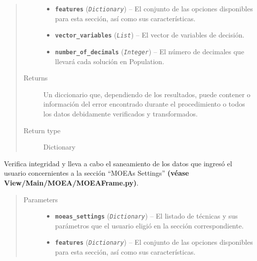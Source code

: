 \documentclass[letterpaper,10pt,english]{sphinxmanual}
\begin{document}
\begin{fulllineitems}
\begin{fulllineitems}
\begin{quote}
\begin{description}
\begin{itemize}
\item {} 
\textbf{\texttt{features}} (\emph{\texttt{Dictionary}}) -- El conjunto de las opciones disponibles 
para esta sección, así como sus características.

\item {} 
\textbf{\texttt{vector\_variables}} (\emph{\texttt{List}}) -- El vector de variables de decisión.

\item {} 
\textbf{\texttt{number\_of\_decimals}} (\emph{\texttt{Integer}}) -- El número de decimales que llevará cada solución en 
Population.

\end{itemize}

\item[{Returns}] \leavevmode
Un diccionario que, dependiendo de los resultados, puede contener
o información del error encontrado durante el procedimiento o 
todos los datos debidamente verificados y transformados.

\item[{Return type}] \leavevmode
Dictionary

\end{description}\end{quote}

\end{fulllineitems}


\begin{fulllineitems}
\label{Controller/Verifier:Controller.Verifier.Verifier.sanitize_moeas_settings}
Verifica integridad y lleva a cabo el saneamiento de 
los datos que ingresó el usuario concernientes a la 
sección ``MOEAs Settings'' \textbf{(véase View/Main/MOEA/MOEAFrame.py)}.
\begin{quote}\begin{description}
\item[{Parameters}] \leavevmode\begin{itemize}
\item {} 
\textbf{\texttt{moeas\_settings}} (\emph{\texttt{Dictionary}}) -- El listado de técnicas y sus parámetros que el usuario
eligió en la sección correspondiente.

\item {} 
\textbf{\texttt{features}} (\emph{\texttt{Dictionary}}) -- El conjunto de las opciones disponibles 
para esta sección, así como sus características.


\end{itemize}
\end{description}
\end{quote}
\end{fulllineitems}
\end{fulllineitems}
\end{document}
